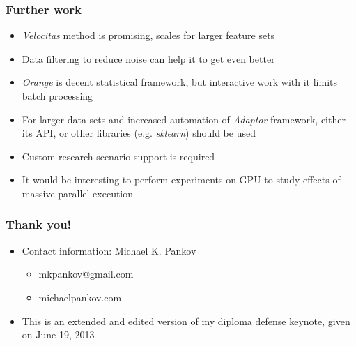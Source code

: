 \documentclass{beamer}
\begin{document}
\begin{frame}
\frametitle{Further work}

	\begin{itemize}
		\item \textit{Velocitas} method is promising, scales for larger feature sets
		\item Data filtering to reduce noise can help it to get even better
		\item \textit{Orange} is decent statistical framework, but interactive work with it limits batch processing
		\item For larger data sets and increased automation of \textit{Adaptor} framework, either its API, or other libraries (e.g. \textit{sklearn}) should be used
		\item Custom research scenario support is required
		\item It would be interesting to perform experiments on GPU to study effects of massive parallel execution
	\end{itemize}
\end{frame}

\begin{frame}
\frametitle{Thank you!}

	\begin{itemize}
		\item Contact information: Michael K. Pankov
		\begin{itemize}
			\item mkpankov@gmail.com
			\item michaelpankov.com
		\end{itemize}
		\item This is an extended and edited version of my diploma defense keynote, given on June 19, 2013
	\end{itemize}
\end{frame}
\end{document}
